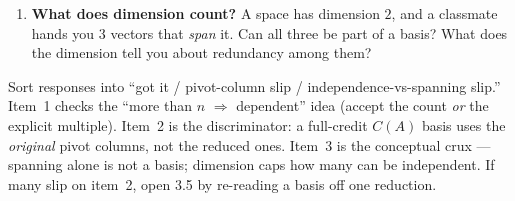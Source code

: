 \documentclass[10pt]{article}
\begin{document}
\begin{enumerate}[leftmargin=1.8em, itemsep=16pt]
  \item \textbf{What does dimension count?} A space has dimension $2$, and a classmate hands you $3$
        vectors that \emph{span} it. Can all three be part of a basis? What does the dimension tell you
        about redundancy among them?
\end{enumerate}

\begin{teachernote}
Sort responses into ``got it / pivot-column slip / independence-vs-spanning slip.'' Item~1 checks the
``more than $n$ $\Rightarrow$ dependent'' idea (accept the count \emph{or} the explicit multiple). Item~2 is
the discriminator: a full-credit $C(A)$ basis uses the \emph{original} pivot columns, not the reduced ones.
Item~3 is the conceptual crux --- spanning alone is not a basis; dimension caps how many can be
independent. If many slip on item~2, open 3.5 by re-reading a basis off one reduction.
\end{teachernote}
\end{document}
